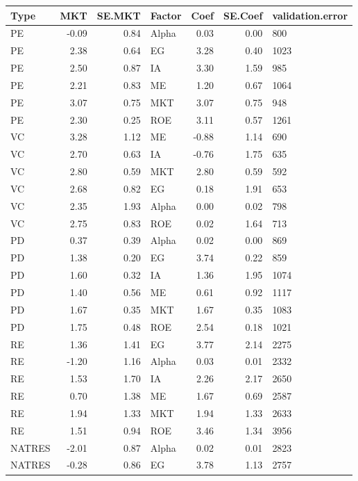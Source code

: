 \documentclass[12pt]{article}
\begin{document}
\begin{table}[ht]
	\centering
	\begin{tabular}{lrrlrrl}
		\hline
		Type & MKT & SE.MKT & Factor & Coef & SE.Coef & validation.error \\ 
		\hline
		PE & -0.09 & 0.84 & Alpha & 0.03 & 0.00 & 800 \\ 
		PE & 2.38 & 0.64 & EG & 3.28 & 0.40 & 1023 \\ 
		PE & 2.50 & 0.87 & IA & 3.30 & 1.59 & 985 \\ 
		PE & 2.21 & 0.83 & ME & 1.20 & 0.67 & 1064 \\ 
		PE & 3.07 & 0.75 & MKT & 3.07 & 0.75 & 948 \\ 
		PE & 2.30 & 0.25 & ROE & 3.11 & 0.57 & 1261 \\ 
		VC & 3.28 & 1.12 & ME & -0.88 & 1.14 & 690 \\ 
		VC & 2.70 & 0.63 & IA & -0.76 & 1.75 & 635 \\ 
		VC & 2.80 & 0.59 & MKT & 2.80 & 0.59 & 592 \\ 
		VC & 2.68 & 0.82 & EG & 0.18 & 1.91 & 653 \\ 
		VC & 2.35 & 1.93 & Alpha & 0.00 & 0.02 & 798 \\ 
		VC & 2.75 & 0.83 & ROE & 0.02 & 1.64 & 713 \\ 
		PD & 0.37 & 0.39 & Alpha & 0.02 & 0.00 & 869 \\ 
		PD & 1.38 & 0.20 & EG & 3.74 & 0.22 & 859 \\ 
		PD & 1.60 & 0.32 & IA & 1.36 & 1.95 & 1074 \\ 
		PD & 1.40 & 0.56 & ME & 0.61 & 0.92 & 1117 \\ 
		PD & 1.67 & 0.35 & MKT & 1.67 & 0.35 & 1083 \\ 
		PD & 1.75 & 0.48 & ROE & 2.54 & 0.18 & 1021 \\ 
		RE & 1.36 & 1.41 & EG & 3.77 & 2.14 & 2275 \\ 
		RE & -1.20 & 1.16 & Alpha & 0.03 & 0.01 & 2332 \\ 
		RE & 1.53 & 1.70 & IA & 2.26 & 2.17 & 2650 \\ 
		RE & 0.70 & 1.38 & ME & 1.67 & 0.69 & 2587 \\ 
		RE & 1.94 & 1.33 & MKT & 1.94 & 1.33 & 2633 \\ 
		RE & 1.51 & 0.94 & ROE & 3.46 & 1.34 & 3956 \\ 
		NATRES & -2.01 & 0.87 & Alpha & 0.02 & 0.01 & 2823 \\ 
		NATRES & -0.28 & 0.86 & EG & 3.78 & 1.13 & 2757 \\ 

\end{tabular}
\end{table}
\end{document}
